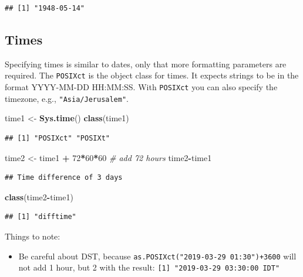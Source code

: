 \documentclass[]{book}
\newenvironment{Shaded}{\begin{snugshade}}{\end{snugshade}}
\newcommand{\KeywordTok}[1]{\textcolor[rgb]{0.13,0.29,0.53}{\textbf{#1}}}
\newcommand{\DecValTok}[1]{\textcolor[rgb]{0.00,0.00,0.81}{#1}}
\newcommand{\StringTok}[1]{\textcolor[rgb]{0.31,0.60,0.02}{#1}}
\newcommand{\CommentTok}[1]{\textcolor[rgb]{0.56,0.35,0.01}{\textit{#1}}}
\newcommand{\OperatorTok}[1]{\textcolor[rgb]{0.81,0.36,0.00}{\textbf{#1}}}
\newcommand{\NormalTok}[1]{#1}
\providecommand{\tightlist}{%
  \setlength{\itemsep}{0pt}\setlength{\parskip}{0pt}}
\theoremstyle{definition}
\theoremstyle{definition}
\theoremstyle{definition}
\theoremstyle{remark}
\begin{document}
\begin{verbatim}
## [1] "1948-05-14"
\end{verbatim}

\subsection{Times}\label{times}

Specifying times is similar to dates, only that more formatting
parameters are required. The \texttt{POSIXct} is the object class for
times. It expects strings to be in the format YYYY-MM-DD HH:MM:SS. With
\texttt{POSIXct} you can also specify the timezone, e.g.,
\texttt{"Asia/Jerusalem"}.

\begin{Shaded}
\begin{Highlighting}[]
\NormalTok{time1 <-}\StringTok{ }\KeywordTok{Sys.time}\NormalTok{()}
\KeywordTok{class}\NormalTok{(time1)}
\end{Highlighting}
\end{Shaded}

\begin{verbatim}
## [1] "POSIXct" "POSIXt"
\end{verbatim}

\begin{Shaded}
\begin{Highlighting}[]
\NormalTok{time2 <-}\StringTok{ }\NormalTok{time1 }\OperatorTok{+}\StringTok{ }\DecValTok{72}\OperatorTok{*}\DecValTok{60}\OperatorTok{*}\DecValTok{60} \CommentTok{# add 72 hours}
\NormalTok{time2}\OperatorTok{-}\NormalTok{time1}
\end{Highlighting}
\end{Shaded}

\begin{verbatim}
## Time difference of 3 days
\end{verbatim}

\begin{Shaded}
\begin{Highlighting}[]
\KeywordTok{class}\NormalTok{(time2}\OperatorTok{-}\NormalTok{time1)}
\end{Highlighting}
\end{Shaded}

\begin{verbatim}
## [1] "difftime"
\end{verbatim}

Things to note:

\begin{itemize}
\tightlist
\item
  Be careful about DST, because
  \texttt{as.POSIXct("2019-03-29\ 01:30")+3600} will not add 1 hour, but
  2 with the result: \texttt{{[}1{]}\ "2019-03-29\ 03:30:00\ IDT"}
\end{itemize}
\end{document}
